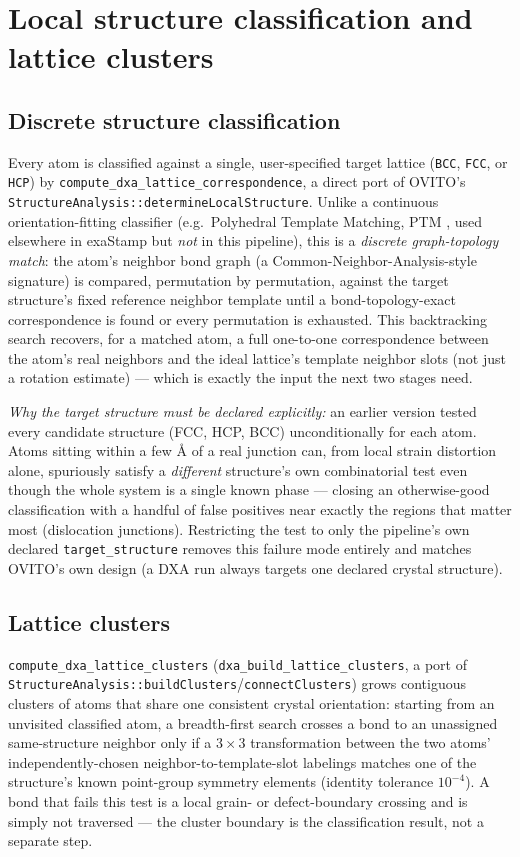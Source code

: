 \documentclass[11pt,a4paper]{article}
\newcommand{\op}[1]{\texttt{#1}}
\newcommand{\code}[1]{\texttt{#1}}
\begin{document}
\section{Local structure classification and lattice clusters}

\subsection{Discrete structure classification}

Every atom is classified against a single, user-specified target lattice (\code{BCC}, \code{FCC},
or \code{HCP}) by \op{compute\_dxa\_lattice\_correspondence}, a direct port of OVITO's
\code{StructureAnalysis::determineLocalStructure}. Unlike a continuous orientation-fitting
classifier (e.g.\ Polyhedral Template Matching, PTM \cite{ptm2016}, used elsewhere in exaStamp but
\emph{not} in this pipeline), this is a \emph{discrete graph-topology match}: the atom's neighbor
bond graph (a Common-Neighbor-Analysis-style signature) is compared, permutation by permutation,
against the target structure's fixed reference neighbor template until a bond-topology-exact
correspondence is found or every permutation is exhausted. This backtracking search recovers,
for a matched atom, a full one-to-one correspondence between the atom's real neighbors and the
ideal lattice's template neighbor slots (not just a rotation estimate) — which is exactly the
input the next two stages need.

\emph{Why the target structure must be declared explicitly:} an earlier version tested every
candidate structure (FCC, HCP, BCC) unconditionally for each atom. Atoms sitting within a few
\AA{} of a real junction can, from local strain distortion alone, spuriously satisfy a
\emph{different} structure's own combinatorial test even though the whole system is a single known
phase — closing an otherwise-good classification with a handful of false positives near exactly the
regions that matter most (dislocation junctions). Restricting the test to only the pipeline's own
declared \code{target\_structure} removes this failure mode entirely and matches OVITO's own design
(a DXA run always targets one declared crystal structure).

\subsection{Lattice clusters}

\op{compute\_dxa\_lattice\_clusters} (\code{dxa\_build\_lattice\_clusters}, a port of
\code{StructureAnalysis::buildClusters}/\code{connectClusters}) grows contiguous clusters of atoms
that share one consistent crystal orientation: starting from an unvisited classified atom, a
breadth-first search crosses a bond to an unassigned same-structure neighbor only if a $3\times3$
transformation between the two atoms' independently-chosen neighbor-to-template-slot labelings
matches one of the structure's known point-group symmetry elements (identity tolerance
$10^{-4}$). A bond that fails this test is a local grain- or defect-boundary crossing and is simply
not traversed — the cluster boundary is the classification result, not a separate step.
\end{document}
